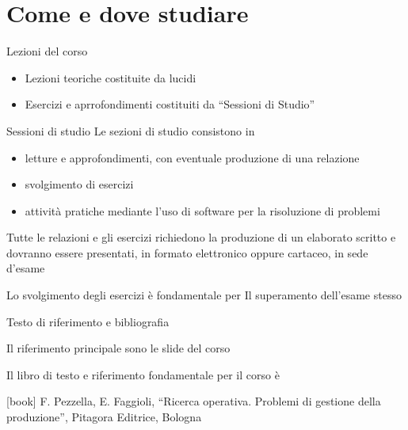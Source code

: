 \documentclass{beamer}
\begin{document}

\section{Come e dove studiare}

\begin{frame}{Lezioni del corso}
  \begin{itemize}
    \item Lezioni teoriche costituite da lucidi
    \item Esercizi e aprrofondimenti costituiti da ``Sessioni di Studio''
  \end{itemize}
\end{frame}


\begin{frame}{Sessioni di studio}
    Le sezioni di studio consistono  in
    \begin{itemize}
     \item letture e approfondimenti, con eventuale produzione di una relazione
     \item svolgimento di esercizi
     \item attivit\`a pratiche mediante l'uso di software per la risoluzione di problemi
    \end{itemize}
    
    Tutte le relazioni e \alert{gli esercizi} richiedono la produzione di un elaborato scritto e
    \alert{dovranno essere presentati}, in formato elettronico oppure cartaceo, \alert{in sede d'esame}
 
    Lo \alert{svolgimento degli esercizi \`e fondamentale} per Il superamento dell'esame stesso
\end{frame}

\begin{frame}{Testo di riferimento e bibliografia}

    Il riferimento principale sono le slide del corso
    
    \vspace*{1cm}

    Il libro di testo e riferimento fondamentale per il corso \`e
    \begin{thebibliography}{9}
      [book]
       F. Pezzella, E. Faggioli, ``Ricerca operativa. Problemi di gestione della produzione'', Pitagora Editrice, Bologna
    \end{thebibliography}
\end{frame}
\end{document}
